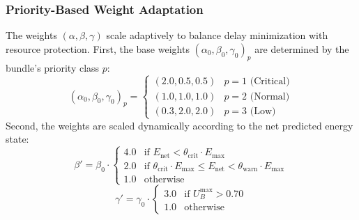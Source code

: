 \documentclass[a4paper,fleqn]{cas-dc}
\begin{document}
\subsubsection{Priority-Based Weight Adaptation}
The weights $(\alpha, \beta, \gamma)$ scale adaptively to balance delay minimization with resource protection. First, the base weights $(\alpha_0, \beta_0, \gamma_0)_p$ are determined by the bundle's priority class $p$:
\begin{equation}
    (\alpha_0, \beta_0, \gamma_0)_p = \begin{cases}
        (2.0, 0.5, 0.5) & p = 1 \text{ (Critical)} \\
        (1.0, 1.0, 1.0) & p = 2 \text{ (Normal)} \\
        (0.3, 2.0, 2.0) & p = 3 \text{ (Low)}
    \end{cases}
\end{equation}
Second, the weights are scaled dynamically according to the net predicted energy state:
\begin{equation}
    \beta' = \beta_0 \cdot \begin{cases}
        4.0 & \text{if } E_{\text{net}} < \theta_{\text{crit}} \cdot E_{\max} \\
        2.0 & \text{if } \theta_{\text{crit}} \cdot E_{\max} \leq E_{\text{net}} < \theta_{\text{warn}} \cdot E_{\max} \\
        1.0 & \text{otherwise}
    \end{cases}
\end{equation}
\begin{equation}
    \gamma' = \gamma_0 \cdot \begin{cases}
        3.0 & \text{if } U_B^{\max} > 0.70 \\
        1.0 & \text{otherwise}
    \end{cases}
\end{equation}
\end{document}
